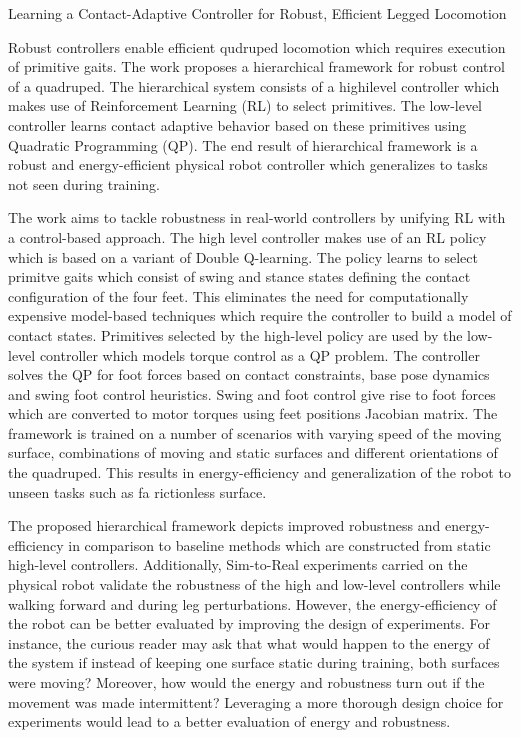 \documentclass[11pt,letterpaper]{article}
\begin{document}
\begin{center}
  \large{Learning a Contact-Adaptive Controller for Robust,
  Efficient Legged Locomotion}
\end{center}

Robust controllers enable efficient qudruped locomotion which requires execution of primitive gaits. The work proposes a hierarchical framework for robust control of a quadruped. The hierarchical system consists of a highilevel controller which makes use of Reinforcement Learning (RL) to select primitives. The low-level controller learns contact adaptive behavior based on these primitives using Quadratic Programming (QP). The end result of hierarchical framework is a robust and energy-efficient physical robot controller which generalizes to tasks not seen during training.  

The work aims to tackle robustness in real-world controllers by unifying RL with a control-based approach. The high level controller makes use of an RL policy which is based on a variant of Double Q-learning. The policy learns to select primitve gaits which consist of swing and stance states defining the contact configuration of the four feet. This eliminates the need for computationally expensive model-based techniques which require the controller to build a model of contact states. Primitives selected by the high-level policy are used by the low-level controller which models torque control as a QP problem. The controller solves the QP for foot forces based on contact constraints, base pose dynamics and swing foot control heuristics. Swing and foot control give rise to foot forces which are converted to motor torques using feet positions Jacobian matrix. The framework is trained on a number of scenarios with varying speed of the moving surface, combinations of moving and static surfaces and different orientations of the quadruped. This results in energy-efficiency and generalization of the robot to unseen tasks such as fa rictionless surface.

The proposed hierarchical framework depicts improved robustness and energy-efficiency in comparison to baseline methods which are constructed from static high-level controllers. Additionally, Sim-to-Real experiments carried on the physical robot validate the robustness of the high and low-level controllers while walking forward and during leg perturbations. However, the energy-efficiency of the robot can be better evaluated by improving the design of experiments. For instance, the curious reader may ask that what would happen to the energy of the system if instead of keeping one surface static during training, both surfaces were moving? Moreover, how would the energy and robustness turn out if the movement was made intermittent? Leveraging a more thorough design choice for experiments would lead to a better evaluation of energy and robustness. 
\end{document}
